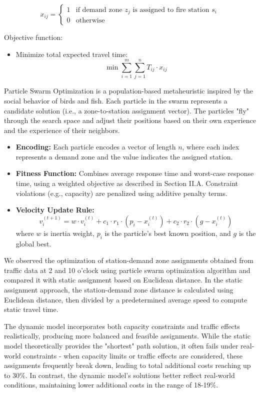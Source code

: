 \documentclass[conference]{IEEEtran}
\begin{document}
\[
x_{ij} =
\begin{cases}
1 & \text{if demand zone } z_j \text{ is assigned to fire station } s_i \\
0 & \text{otherwise}
\end{cases}
\]

Objective function:
\begin{itemize}
  \item Minimize total expected travel time:
  \[
  \min \sum_{i=1}^{m} \sum_{j=1}^{n} T_{ij} \cdot x_{ij}
  \]
\end{itemize}

Particle Swarm Optimization is a population-based metaheuristic inspired by the social behavior of birds and fish. Each particle in the swarm represents a candidate solution (i.e., a zone-to-station assignment vector). The particles "fly" through the search space and adjust their positions based on their own experience and the experience of their neighbors.

\begin{itemize}
  \item \textbf{Encoding:} Each particle encodes a vector of length $n$, where each index represents a demand zone and the value indicates the assigned station.
  \item \textbf{Fitness Function:} Combines average response time and worst-case response time, using a weighted objective as described in Section II.A. Constraint violations (e.g., capacity) are penalized using additive penalty terms.
  \item \textbf{Velocity Update Rule:}
  \[
  v_i^{(t+1)} = w \cdot v_i^{(t)} + c_1 \cdot r_1 \cdot (p_i - x_i^{(t)}) + c_2 \cdot r_2 \cdot (g - x_i^{(t)})
  \]
  where $w$ is inertia weight, $p_i$ is the particle’s best known position, and $g$ is the global best.
\end{itemize}

We observed the optimization of station-demand zone assignments obtained from traffic data at 2 and 10 o'clock using particle swarm optimization algorithm and compared it with static assignment based on Euclidean distance. In the static assignment approach, the station-demand zone distance is calculated using Euclidean distance, then divided by a predetermined average speed to compute static travel time. 

The dynamic model incorporates both capacity constraints and traffic effects realistically, producing more balanced and feasible assignments. While the static model theoretically provides the "shortest" path solution, it often fails under real-world constraints - when capacity limits or traffic effects are considered, these assignments frequently break down, leading to total additional costs reaching up to 30\%. 
In contrast, the dynamic model's solutions better reflect real-world conditions, maintaining lower additional costs in the range of 18-19\%.
\end{document}

